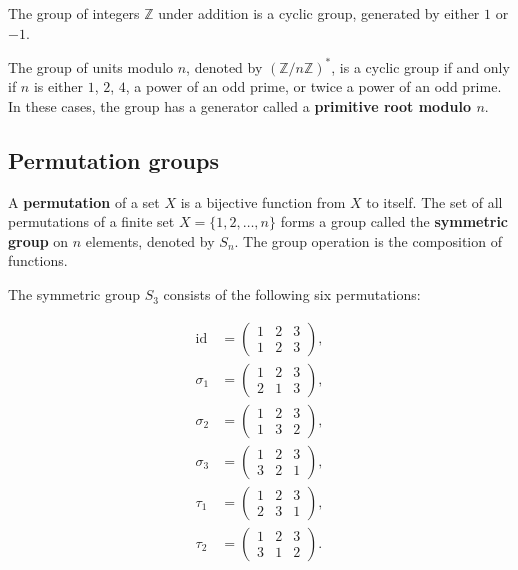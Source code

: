 \begin{example}
  The group of integers $\mathbb{Z}$ under addition is a cyclic group, generated by either $1$ or $-1$.
\end{example}

\begin{example}
  The group of units modulo $n$, denoted by $(\mathbb{Z}/n\mathbb{Z})^*$, is a cyclic group if and only if $n$ is either $1$, $2$, $4$, a power of an odd prime, or twice a power of an odd prime. In these cases, the group has a generator called a \textbf{primitive root modulo $n$}.
\end{example}

\subsection{Permutation groups}
\begin{definition}

  A \textbf{permutation} of a set $X$ is a bijective function from $X$ to itself. The set of all permutations of a finite set $X = \{1, 2, \dots, n\}$ forms a group called the \textbf{symmetric group} on $n$ elements, denoted by $S_n$. The group operation is the composition of functions.

\end{definition}

\begin{example}
  The symmetric group $S_3$ consists of the following six permutations:

  \begin{align*}
    \text{id} &= \begin{pmatrix} 1 & 2 & 3 \\ 1 & 2 & 3 \end{pmatrix}, \\
    \sigma_1 &= \begin{pmatrix} 1 & 2 & 3 \\ 2 & 1 & 3 \end{pmatrix}, \\
    \sigma_2 &= \begin{pmatrix} 1 & 2 & 3 \\ 1 & 3 & 2 \end{pmatrix}, \\
    \sigma_3 &= \begin{pmatrix} 1 & 2 & 3 \\ 3 & 2 & 1 \end{pmatrix}, \\
    \tau_1 &= \begin{pmatrix} 1 & 2 & 3 \\ 2 & 3 & 1 \end{pmatrix}, \\
    \tau_2 &= \begin{pmatrix} 1 & 2 & 3 \\ 3 & 1 & 2 \end{pmatrix}.
  \end{align*}
\end{example}

